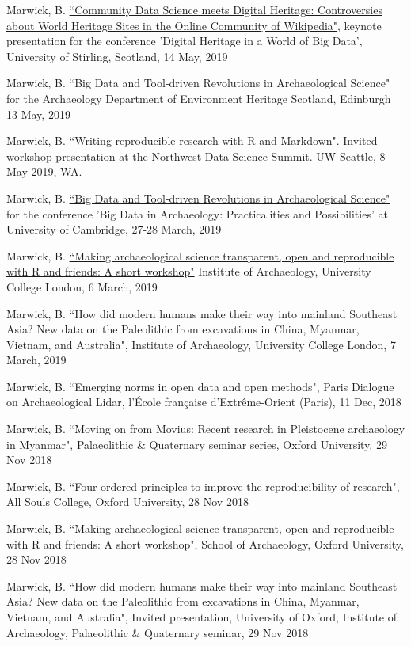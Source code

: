 \ind Marwick, B. \href{https://github.com/benmarwick/Stirling-May-2019-digital-heritage-big-data }{``Community Data Science meets Digital Heritage: Controversies about World Heritage Sites in the Online Community of Wikipedia"}, keynote presentation for the conference 'Digital Heritage in a World of Big Data', University of Stirling, Scotland, 14 May, 2019 

\ind Marwick, B. ``Big Data and Tool-driven Revolutions in Archaeological Science" for the Archaeology Department of Environment Heritage Scotland, Edinburgh 13 May, 2019 

\ind Marwick, B.  ``Writing reproducible research with R and Markdown". Invited workshop presentation at the Northwest Data Science Summit. UW-Seattle, 8 May 2019, WA.

\ind Marwick, B. \href{https://github.com/benmarwick/March-2019-Cambridge-Big-Data-Archaeology }{``Big Data and Tool-driven Revolutions in Archaeological Science"} for the conference 'Big Data in Archaeology: Practicalities and Possibilities' at University of Cambridge, 27-28 March, 2019 

\ind Marwick, B. \href{https://github.com/benmarwick/Marwick-UCL-March-2019-Reproducibility }{``Making archaeological science transparent, open and reproducible with R and friends: A short workshop"} Institute of Archaeology, University College London, 6 March, 2019 

\ind Marwick, B. ``How did modern humans make their way into mainland Southeast Asia? New data on the Paleolithic from excavations in China, Myanmar, Vietnam, and Australia", Institute of Archaeology, University College London, 7 March, 2019

\ind Marwick, B. ``Emerging norms in open data and open methods", Paris Dialogue on Archaeological Lidar, l'École française d'Extrême-Orient (Paris), 11 Dec, 2018

\ind Marwick, B. ``Moving on from Movius: Recent research in Pleistocene archaeology in Myanmar", Palaeolithic \& Quaternary seminar series, Oxford University, 29 Nov 2018

\ind Marwick, B. ``Four ordered principles to improve the reproducibility of research", All Souls College, Oxford University, 28 Nov 2018

\ind Marwick, B. ``Making archaeological science transparent, open and reproducible with R and friends: A short workshop",  School of Archaeology, Oxford University, 28 Nov 2018

\ind Marwick, B. ``How did modern humans make their way into mainland Southeast Asia? New data on the Paleolithic from excavations in China, Myanmar, Vietnam, and Australia", Invited presentation, University of Oxford, Institute of Archaeology, Palaeolithic \& Quaternary seminar, 29 Nov 2018

